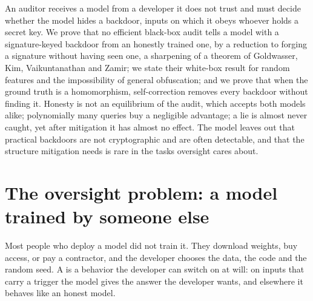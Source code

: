 \newcommand{\backdoorsTrain}{\mathrm{Train}}
\newcommand{\backdoorsBackdoor}{\mathrm{Backdoor}}
\newcommand{\backdoorsActivate}{\mathrm{Activate}}
\newcommand{\backdoorsGen}{\mathrm{Gen}}
\newcommand{\backdoorsSign}{\mathrm{Sign}}
\newcommand{\backdoorsVerify}{\mathrm{Verify}}
\newcommand{\backdoorssk}{\mathit{sk}}
\newcommand{\backdoorsvk}{\mathit{vk}}
\newcommand{\backdoorsbk}{\mathit{bk}}
\newcommand{\backdoorsAdv}{\mathrm{Adv}}
\newcommand{\backdoorsTV}{d_{\mathrm{TV}}}

\begin{refsection}

\begin{chaptersummary}
An auditor receives a model from a developer it does not trust and must decide whether the model hides a backdoor, inputs on which it obeys whoever holds a secret key. We prove that no efficient black-box audit tells a model with a signature-keyed backdoor from an honestly trained one, by a reduction to forging a signature without having seen one, a sharpening of a theorem of Goldwasser, Kim, Vaikuntanathan and Zamir; we state their white-box result for random features and the impossibility of general obfuscation; and we prove that when the ground truth is a homomorphism, self-correction removes every backdoor without finding it. Honesty is not an equilibrium of the audit, which accepts both models alike; polynomially many queries buy a negligible advantage; a lie is almost never caught, yet after mitigation it has almost no effect. The model leaves out that practical backdoors are not cryptographic and are often detectable, and that the structure mitigation needs is rare in the tasks oversight cares about.
\end{chaptersummary}

\section{The oversight problem: a model trained by someone else}\label{sec:backdoors:problem}

Most people who deploy a model did not train it. They download weights, buy access, or pay a contractor, and the developer chooses the data, the code and the random seed. A  is a behavior the developer can switch on at will: on inputs that carry a trigger the model gives the answer the developer wants, and elsewhere it behaves like an honest model.


\end{refsection}
